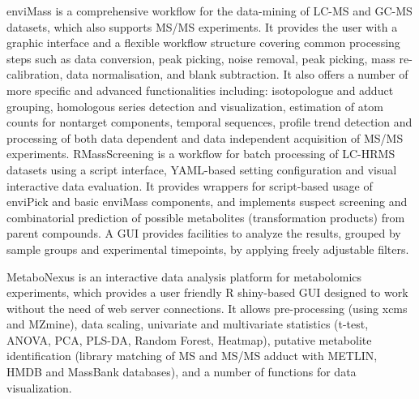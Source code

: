 \documentclass[]{article}
\begin{document}
enviMass is a comprehensive workflow for the data-mining of LC-MS and GC-MS datasets, which also supports MS/MS experiments. It provides the user with a graphic interface and a flexible workflow structure covering common processing steps such as data conversion, peak picking, noise removal, peak picking, mass re-calibration, data normalisation, and blank subtraction. It also offers a number of more specific and advanced functionalities including: isotopologue and adduct grouping, homologous series detection and visualization, estimation of atom counts for nontarget components, temporal sequences, profile trend detection and processing of both data dependent and data independent acquisition of MS/MS experiments. RMassScreening is a workflow for batch processing of LC-HRMS datasets using a script interface, YAML-based setting configuration and visual interactive data evaluation. It provides wrappers for script-based usage of enviPick and basic enviMass components, and implements suspect screening and combinatorial prediction of possible metabolites (transformation products) from parent compounds. A GUI provides facilities to analyze the results, grouped by sample groups and experimental timepoints, by applying freely adjustable filters.

MetaboNexus is an interactive data analysis platform for metabolomics experiments, which provides a user friendly R shiny-based GUI designed to work without the need of web server connections. It allows pre-processing (using xcms and MZmine), data scaling, univariate and multivariate statistics (t-test, ANOVA, PCA, PLS-DA, Random Forest, Heatmap), putative metabolite identification (library matching of MS and MS/MS adduct with METLIN, HMDB and MassBank databases), and a number of functions for data visualization.
\end{document}

